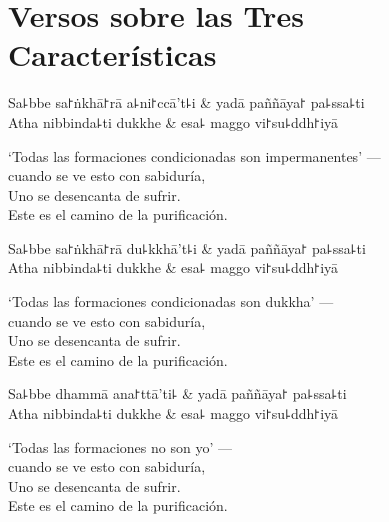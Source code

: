 \chapter{Versos sobre las Tres Características}


\begin{leader}
\end{leader}

\begin{twochants}
  Sa꜕bbe sa꜓ṅkhā꜓rā a꜕ni꜓ccā't꜕i & yadā paññāya꜓ pa꜕ssa꜕ti \\
  Atha nibbinda꜕ti dukkhe & esa꜕ maggo vi꜓su꜕ddh꜓iyā \\
\end{twochants}

\begin{english}
  `Todas las formaciones condicionadas son impermanentes' ---\\
  cuando se ve esto con sabiduría,\\
  Uno se desencanta de sufrir.\\
  Este es el camino de la purificación.
\end{english}

\begin{twochants}
  Sa꜕bbe sa꜓ṅkhā꜓rā du꜕kkhā't꜕i & yadā paññāya꜓ pa꜕ssa꜕ti \\
  Atha nibbinda꜕ti dukkhe & esa꜕ maggo vi꜓su꜕ddh꜓iyā \\
\end{twochants}

\begin{english}
  `Todas las formaciones condicionadas son dukkha' ---\\
  cuando se ve esto con sabiduría,\\
  Uno se desencanta de sufrir.\\
  Este es el camino de la purificación.
\end{english}

\begin{twochants}
  Sa꜕bbe dhammā ana꜓ttā'ti꜕ & yadā paññāya꜓ pa꜕ssa꜕ti \\
  Atha nibbinda꜕ti dukkhe & esa꜕ maggo vi꜓su꜕ddh꜓iyā \\
\end{twochants}

\begin{english}
  `Todas las formaciones no son yo' ---\\
  cuando se ve esto con sabiduría,\\
  Uno se desencanta de sufrir.\\
  Este es el camino de la purificación.
\end{english}

